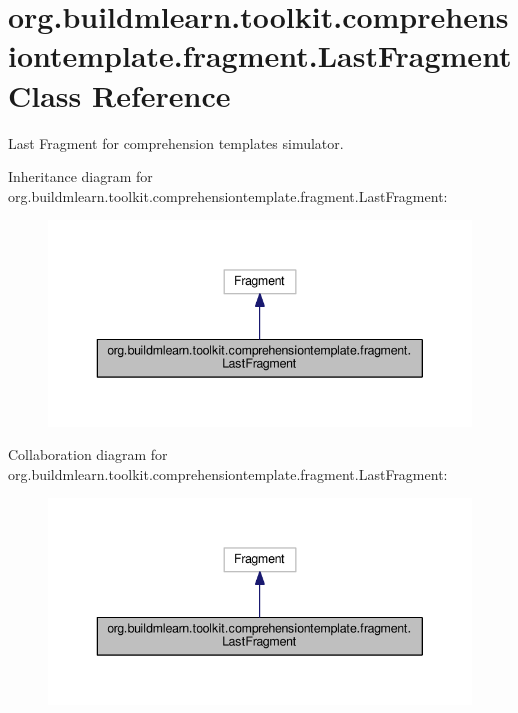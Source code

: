 \hypertarget{classorg_1_1buildmlearn_1_1toolkit_1_1comprehensiontemplate_1_1fragment_1_1LastFragment}{}\section{org.\+buildmlearn.\+toolkit.\+comprehensiontemplate.\+fragment.\+Last\+Fragment Class Reference}
\label{classorg_1_1buildmlearn_1_1toolkit_1_1comprehensiontemplate_1_1fragment_1_1LastFragment}


Last Fragment for comprehension template\textquotesingle{}s simulator.  




Inheritance diagram for org.\+buildmlearn.\+toolkit.\+comprehensiontemplate.\+fragment.\+Last\+Fragment\+:
\nopagebreak
\begin{figure}[H]
\begin{center}
\leavevmode
\includegraphics[width=343pt]{classorg_1_1buildmlearn_1_1toolkit_1_1comprehensiontemplate_1_1fragment_1_1LastFragment__inherit__graph}
\end{center}
\end{figure}


Collaboration diagram for org.\+buildmlearn.\+toolkit.\+comprehensiontemplate.\+fragment.\+Last\+Fragment\+:
\nopagebreak
\begin{figure}[H]
\begin{center}
\leavevmode
\includegraphics[width=343pt]{classorg_1_1buildmlearn_1_1toolkit_1_1comprehensiontemplate_1_1fragment_1_1LastFragment__coll__graph}
\end{center}
\end{figure}
